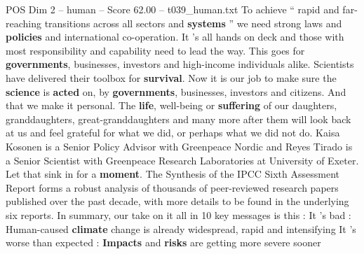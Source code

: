 \begin{textsample}{POS Dim 2 – human – Score 62.00 – t039\_human.txt}
To achieve “ rapid and far-reaching transitions across all sectors and \textbf{systems} ” we need strong laws and \textbf{policies} and international co-operation.
It ’s all hands on deck and those with most responsibility and capability need to lead the way.
This goes for \textbf{governments}, businesses, investors and high-income individuals alike.
Scientists have delivered their toolbox for \textbf{survival}.
Now it is our job to make sure the \textbf{science} is \textbf{acted} on, by \textbf{governments}, businesses, investors and citizens.
And that we make it personal.
The \textbf{life}, well-being or \textbf{suffering} of our daughters, granddaughters, great-granddaughters and many more after them will look back at us and feel grateful for what we did, or perhaps what we did not do.
Kaisa Kosonen is a Senior Policy Advisor with Greenpeace Nordic and Reyes Tirado is a Senior Scientist with Greenpeace Research Laboratories at University of Exeter.
Let that sink in for a \textbf{moment}.
The Synthesis of the IPCC Sixth Assessment Report forms a robust analysis of thousands of peer-reviewed research papers published over the past decade, with more details to be found in the underlying six reports.
In summary, our take on it all in 10 key messages is this : It ’s bad : Human-caused \textbf{climate} change is already widespread, rapid and intensifying It ’s worse than expected : \textbf{Impacts} and \textbf{risks} are getting more severe sooner

\end{textsample}
